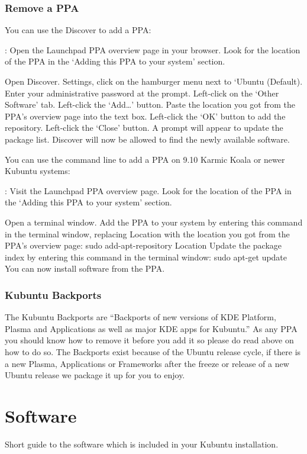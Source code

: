 \documentclass[letterpaper,10pt,english]{sphinxmanual}
\begin{document}
\subsection{Remove a PPA}
\label{\detokenize{docs/repositories:remove-a-ppa}}
You can use the Discover to add a PPA:

: Open the Launchpad PPA overview page in your browser. Look for the location of the PPA in the ‘Adding this PPA to your system’ section.

Open Discover. Settings, click on the hamburger menu next to ‘Ubuntu (Default). Enter your administrative password at the prompt. Left-click on the ‘Other Software’ tab. Left-click the ‘Add…’ button. Paste the location you got from the PPA’s overview page into the text box. Left-click the ‘OK’ button to add the repository. Left-click the ‘Close’ button. A prompt will appear to update the package list. Discover will now be allowed to find the newly available software.

You can use the command line to add a PPA on 9.10 Karmic Koala or newer Kubuntu systems:

: Visit the Launchpad PPA overview page. Look for the location of the PPA in the ‘Adding this PPA to your system’ section.

Open a terminal window. Add the PPA to your system by entering this command in the terminal window, replacing Location with the location you got from the PPA’s overview page: sudo add-apt-repository Location Update the package index by entering this command in the terminal window: sudo apt-get update You can now install software from the PPA.


\subsection{Kubuntu Backports}
\label{\detokenize{docs/repositories:kubuntu-backports}}
The Kubuntu Backports are “Backports of new versions of KDE Platform, Plasma and Applications as well as major KDE apps for Kubuntu.” As any PPA you should know how to remove it before you add it so please do read above on how to do so. The Backports exist because of the Ubuntu release cycle, if there is a new Plasma, Applications or Frameworks after the freeze or release of a new Ubuntu release we package it up for you to enjoy.



\chapter{Software}
\label{\detokenize{docs/software:software}}\label{\detokenize{docs/software:software-link}}\label{\detokenize{docs/software::doc}}
Short guide to the software which is included in your Kubuntu installation.
\end{document}
